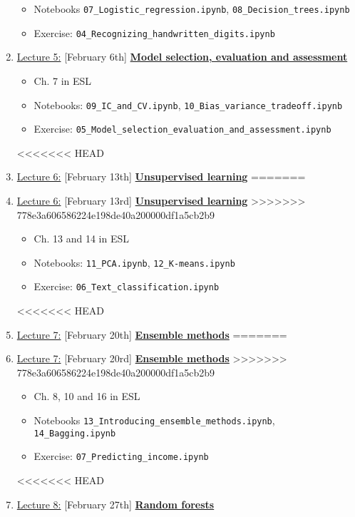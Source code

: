 \documentclass[12pt, a4paper]{article}
\begin{document}
\begin{enumerate}
{\begin{itemize}
            \item Notebooks \texttt{07\_Logistic\_regression.ipynb}, \texttt{08\_Decision\_trees.ipynb}
            \item Exercise: \texttt{04\_Recognizing\_handwritten\_digits.ipynb}
          \end{itemize}
        }
  \item[] \underline{Lecture 5:} [February 6th] \underline{\bf Model selection, evaluation and assessment}
    {\small
      \begin{itemize}
        \item Ch. 7 in ESL
        \item Notebooks: \texttt{09\_IC\_and\_CV.ipynb}, \texttt{10\_Bias\_variance\_tradeoff.ipynb}
        \item Exercise: \texttt{05\_Model\_selection\_evaluation\_and\_assessment.ipynb}
      \end{itemize}
    }
<<<<<<< HEAD
  \item[] \underline{Lecture 6:} [February 13th] \underline{\bf Unsupervised learning}
=======
  \item[] \underline{Lecture 6:} [February 13rd] \underline{\bf Unsupervised learning}
>>>>>>> 778e3a606586224e198de40a200000df1a5cb2b9
    {\small
      \begin{itemize}
        \item Ch. 13 and 14 in ESL
        \item Notebooks: \texttt{11\_PCA.ipynb}, \texttt{12\_K-means.ipynb}
        \item Exercise: \texttt{06\_Text\_classification.ipynb}
      \end{itemize}
    }
<<<<<<< HEAD
  \item[] \underline{Lecture 7:} [February 20th] \underline{\bf Ensemble methods}
=======
  \item[] \underline{Lecture 7:} [February 20rd] \underline{\bf Ensemble methods}
>>>>>>> 778e3a606586224e198de40a200000df1a5cb2b9
    {\small
      \begin{itemize}
        \item Ch. 8, 10 and  16 in ESL
        \item Notebooks \texttt{13\_Introducing\_ensemble\_methods.ipynb}, \texttt{14\_Bagging.ipynb}
        \item Exercise: \texttt{07\_Predicting\_income.ipynb}
      \end{itemize}
    }
<<<<<<< HEAD
  \item[] \underline{Lecture 8:} [February 27th] \underline{\bf Random forests}

\end{enumerate}
\end{document}
